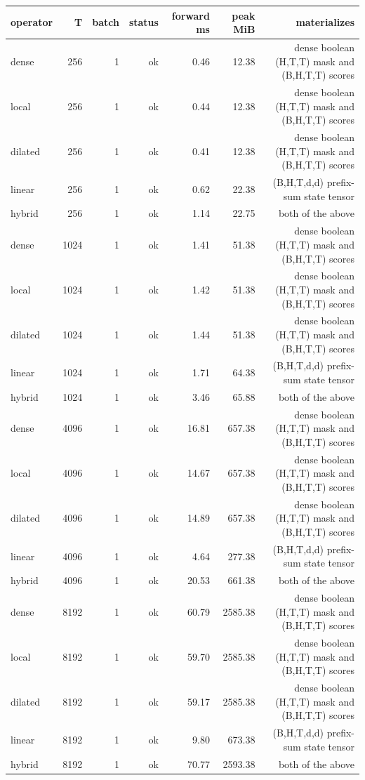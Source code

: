 \begin{tabular}{lrrrrrr}
\toprule
operator & T & batch & status & forward ms & peak MiB & materializes \\
\midrule
dense & 256 & 1 & ok & 0.46 & 12.38 & dense boolean (H,T,T) mask and (B,H,T,T) scores \\
local & 256 & 1 & ok & 0.44 & 12.38 & dense boolean (H,T,T) mask and (B,H,T,T) scores \\
dilated & 256 & 1 & ok & 0.41 & 12.38 & dense boolean (H,T,T) mask and (B,H,T,T) scores \\
linear & 256 & 1 & ok & 0.62 & 22.38 & (B,H,T,d,d) prefix-sum state tensor \\
hybrid & 256 & 1 & ok & 1.14 & 22.75 & both of the above \\
dense & 1024 & 1 & ok & 1.41 & 51.38 & dense boolean (H,T,T) mask and (B,H,T,T) scores \\
local & 1024 & 1 & ok & 1.42 & 51.38 & dense boolean (H,T,T) mask and (B,H,T,T) scores \\
dilated & 1024 & 1 & ok & 1.44 & 51.38 & dense boolean (H,T,T) mask and (B,H,T,T) scores \\
linear & 1024 & 1 & ok & 1.71 & 64.38 & (B,H,T,d,d) prefix-sum state tensor \\
hybrid & 1024 & 1 & ok & 3.46 & 65.88 & both of the above \\
dense & 4096 & 1 & ok & 16.81 & 657.38 & dense boolean (H,T,T) mask and (B,H,T,T) scores \\
local & 4096 & 1 & ok & 14.67 & 657.38 & dense boolean (H,T,T) mask and (B,H,T,T) scores \\
dilated & 4096 & 1 & ok & 14.89 & 657.38 & dense boolean (H,T,T) mask and (B,H,T,T) scores \\
linear & 4096 & 1 & ok & 4.64 & 277.38 & (B,H,T,d,d) prefix-sum state tensor \\
hybrid & 4096 & 1 & ok & 20.53 & 661.38 & both of the above \\
dense & 8192 & 1 & ok & 60.79 & 2585.38 & dense boolean (H,T,T) mask and (B,H,T,T) scores \\
local & 8192 & 1 & ok & 59.70 & 2585.38 & dense boolean (H,T,T) mask and (B,H,T,T) scores \\
dilated & 8192 & 1 & ok & 59.17 & 2585.38 & dense boolean (H,T,T) mask and (B,H,T,T) scores \\
linear & 8192 & 1 & ok & 9.80 & 673.38 & (B,H,T,d,d) prefix-sum state tensor \\
hybrid & 8192 & 1 & ok & 70.77 & 2593.38 & both of the above \\
\bottomrule
\end{tabular}
